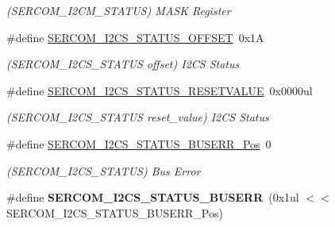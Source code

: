 \begin{DoxyCompactItemize}
\begin{DoxyCompactList}\small\item\em (S\+E\+R\+C\+O\+M\+\_\+\+I2\+C\+M\+\_\+\+S\+T\+A\+T\+U\+S) M\+A\+S\+K Register \end{DoxyCompactList}\item 
\hypertarget{group___s_a_m_l21___s_e_r_c_o_m_ga50e5e24ad4bf0835469c6e8ca3b14992}{}\#define \hyperlink{group___s_a_m_l21___s_e_r_c_o_m_ga50e5e24ad4bf0835469c6e8ca3b14992}{S\+E\+R\+C\+O\+M\+\_\+\+I2\+C\+S\+\_\+\+S\+T\+A\+T\+U\+S\+\_\+\+O\+F\+F\+S\+E\+T}~0x1\+A\label{group___s_a_m_l21___s_e_r_c_o_m_ga50e5e24ad4bf0835469c6e8ca3b14992}

\begin{DoxyCompactList}\small\item\em (S\+E\+R\+C\+O\+M\+\_\+\+I2\+C\+S\+\_\+\+S\+T\+A\+T\+U\+S offset) I2\+C\+S Status \end{DoxyCompactList}\item 
\hypertarget{group___s_a_m_l21___s_e_r_c_o_m_ga56aa9fcf9afe14b13caf1385149e69de}{}\#define \hyperlink{group___s_a_m_l21___s_e_r_c_o_m_ga56aa9fcf9afe14b13caf1385149e69de}{S\+E\+R\+C\+O\+M\+\_\+\+I2\+C\+S\+\_\+\+S\+T\+A\+T\+U\+S\+\_\+\+R\+E\+S\+E\+T\+V\+A\+L\+U\+E}~0x0000ul\label{group___s_a_m_l21___s_e_r_c_o_m_ga56aa9fcf9afe14b13caf1385149e69de}

\begin{DoxyCompactList}\small\item\em (S\+E\+R\+C\+O\+M\+\_\+\+I2\+C\+S\+\_\+\+S\+T\+A\+T\+U\+S reset\+\_\+value) I2\+C\+S Status \end{DoxyCompactList}\item 
\hypertarget{group___s_a_m_l21___s_e_r_c_o_m_ga3b48f511b23dff0bf237db3d37ffa80f}{}\#define \hyperlink{group___s_a_m_l21___s_e_r_c_o_m_ga3b48f511b23dff0bf237db3d37ffa80f}{S\+E\+R\+C\+O\+M\+\_\+\+I2\+C\+S\+\_\+\+S\+T\+A\+T\+U\+S\+\_\+\+B\+U\+S\+E\+R\+R\+\_\+\+Pos}~0\label{group___s_a_m_l21___s_e_r_c_o_m_ga3b48f511b23dff0bf237db3d37ffa80f}

\begin{DoxyCompactList}\small\item\em (S\+E\+R\+C\+O\+M\+\_\+\+I2\+C\+S\+\_\+\+S\+T\+A\+T\+U\+S) Bus Error \end{DoxyCompactList}\item 
\hypertarget{group___s_a_m_l21___s_e_r_c_o_m_gabf88cdf0be2d4aafe3cec04bf46de5d7}{}\#define {\bfseries S\+E\+R\+C\+O\+M\+\_\+\+I2\+C\+S\+\_\+\+S\+T\+A\+T\+U\+S\+\_\+\+B\+U\+S\+E\+R\+R}~(0x1ul $<$$<$ S\+E\+R\+C\+O\+M\+\_\+\+I2\+C\+S\+\_\+\+S\+T\+A\+T\+U\+S\+\_\+\+B\+U\+S\+E\+R\+R\+\_\+\+Pos)\label{group___s_a_m_l21___s_e_r_c_o_m_gabf88cdf0be2d4aafe3cec04bf46de5d7}


\end{DoxyCompactItemize}
